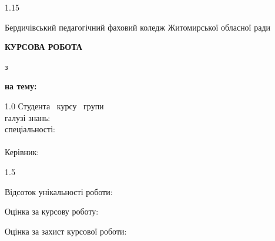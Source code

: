 \documentclass[14pt, a4paper]{extreport}
\begin{document}
\begin{spacing}{1.15}
\begin{center}
{\fontsize{14}{17}\selectfont Бердичівський педагогічний фаховий коледж Житомирської обласної ради}
\end{center}
\begin{center}{\fontsize{14}{17}\selectfont \mykomisiya}\end{center}
\vspace{10pt}
\begin{center}{\fontsize{16}{20}\selectfont\bfseries КУРСОВА РОБОТА}\end{center}
\begin{center}{\fontsize{16}{20}\selectfont з~\mydystsyplina}\end{center}
\begin{center}
{\fontsize{16}{20}\selectfont\bfseries на тему:}~{\fontsize{18}{22}\selectfont\bfseries \mytema}
\end{center}
\vspace{10pt}
\begin{flushleft}
\hspace{6.5cm}%
\begin{minipage}{8cm}
\begin{spacing}{1.0}
{\fontsize{14}{17}\selectfont
Студента \mycourse\ курсу \mygroup\ групи\\[1pt]
галузі знань: \mygaluz\\[1pt]
спеціальності: \myspec\\[1pt]
\mystudent\\[1pt]
Керівник: \mykerivnyk\\[1pt]
\mykerivnykposada}
\end{spacing}
\end{minipage}
\end{flushleft}
\vspace{8pt}
\begin{flushleft}
\hspace*{6.5cm}%
\parbox[t]{9cm}{%
\begin{spacing}{1.5}
{\fontsize{14}{17}\selectfont
Відсоток унікальності роботи: \hrulefill\par
Оцінка за курсову роботу: \hrulefill\par
Оцінка за захист курсової роботи: \hrulefill}
\end{spacing}}
\end{flushleft}
\vspace{8pt}
\begin{flushleft}
\hspace{3cm}{\fontsize{14}{17}\selectfont
}
\end{flushleft}
\end{spacing}
\end{document}
